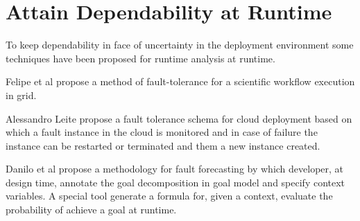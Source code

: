 \section{Attain Dependability at Runtime }
To keep dependability in face of uncertainty in the deployment environment some techniques have been proposed for runtime analysis at runtime.


Felipe et al\cite{guimaraes_framework_2013} propose a method of fault-tolerance for a scientific workflow execution in grid.

Alessandro Leite \cite{ferreira_leite_user_2014} propose a fault tolerance schema for cloud deployment based on which a fault instance in the cloud is monitored and in case of failure the instance can be restarted or terminated and them a new instance created.

Danilo et al\cite{mendonca_dependability_2015} propose a methodology for fault forecasting by which developer, at design time, annotate the goal decomposition in goal model and specify context variables. A special tool generate a formula for, given a context, evaluate the probability of achieve a goal at runtime.



